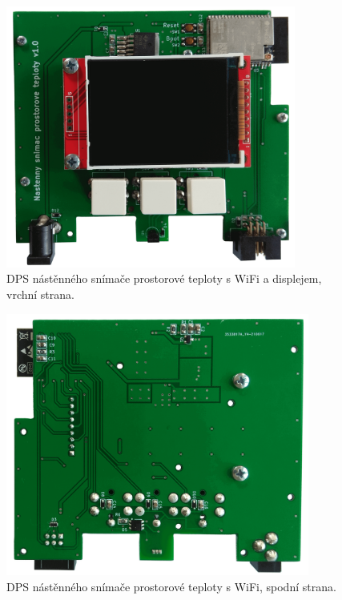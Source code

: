 \begin{figure}[H]
    \centering
    \includegraphics[width=0.85\textwidth]{images/nastenny-snimac-prostorove-teploty-wifi/dps-nastenny-snimac-prostorove-teploty-wifi-vrchni-cast-displej.png}
    \caption{DPS nástěnného snímače prostorové teploty s WiFi a displejem, vrchní strana.}
    \label{fig:dps-nastenny-snimac-prostorove-teploty-wifi-vrchni-cast-displej}
\end{figure}

\begin{figure}[H]
    \centering
    \includegraphics[width=0.89\textwidth]{images/nastenny-snimac-prostorove-teploty-wifi/dps-nastenny-snimac-prostorove-teploty-wifi-spodni-cast.png}
    \caption{DPS nástěnného snímače prostorové teploty s WiFi, spodní strana.}
    \label{fig:dps-nastenny-snimac-prostorove-teploty-wifi-spodni-cast}
\end{figure}
